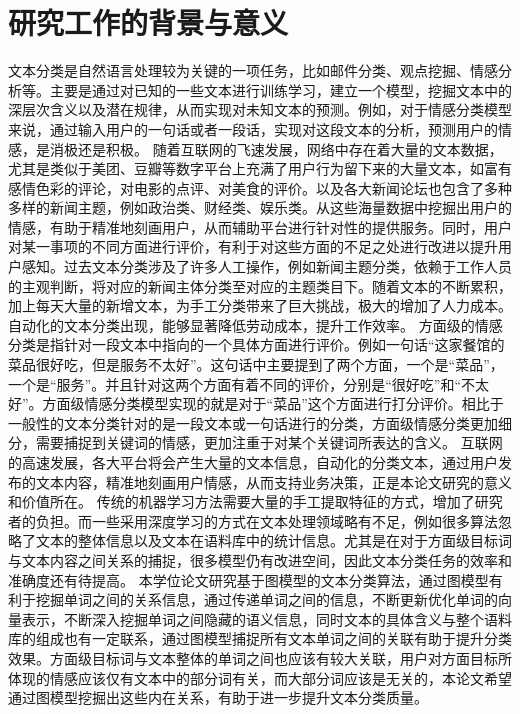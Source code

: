 \thesischapterexordium

\section{研究工作的背景与意义}
文本分类是自然语言处理较为关键的一项任务，比如邮件分类、观点挖掘、情感分析等。主要是通过对已知的一些文本进行训练学习，建立一个模型，挖掘文本中的深层次含义以及潜在规律，从而实现对未知文本的预测。例如，对于情感分类模型来说，通过输入用户的一句话或者一段话，实现对这段文本的分析，预测用户的情感，是消极还是积极。
随着互联网的飞速发展，网络中存在着大量的文本数据，尤其是类似于美团、豆瓣等数字平台上充满了用户行为留下来的大量文本，如富有感情色彩的评论，对电影的点评、对美食的评价。以及各大新闻论坛也包含了多种多样的新闻主题，例如政治类、财经类、娱乐类。从这些海量数据中挖掘出用户的情感，有助于精准地刻画用户，从而辅助平台进行针对性的提供服务。同时，用户对某一事项的不同方面进行评价，有利于对这些方面的不足之处进行改进以提升用户感知。过去文本分类涉及了许多人工操作，例如新闻主题分类，依赖于工作人员的主观判断，将对应的新闻主体分类至对应的主题类目下。随着文本的不断累积，加上每天大量的新增文本，为手工分类带来了巨大挑战，极大的增加了人力成本。自动化的文本分类出现，能够显著降低劳动成本，提升工作效率。
方面级的情感分类是指针对一段文本中指向的一个具体方面进行评价。例如一句话“这家餐馆的菜品很好吃，但是服务不太好”。这句话中主要提到了两个方面，一个是“菜品”，一个是“服务”。并且针对这两个方面有着不同的评价，分别是“很好吃”和“不太好”。方面级情感分类模型实现的就是对于“菜品”这个方面进行打分评价。相比于一般性的文本分类针对的是一段文本或一句话进行的分类，方面级情感分类更加细分，需要捕捉到关键词的情感，更加注重于对某个关键词所表达的含义。
互联网的高速发展，各大平台将会产生大量的文本信息，自动化的分类文本，通过用户发布的文本内容，精准地刻画用户情感，从而支持业务决策，正是本论文研究的意义和价值所在。
传统的机器学习方法需要大量的手工提取特征的方式，增加了研究者的负担。而一些采用深度学习的方式在文本处理领域略有不足，例如很多算法忽略了文本的整体信息以及文本在语料库中的统计信息。尤其是在对于方面级目标词与文本内容之间关系的捕捉，很多模型仍有改进空间，因此文本分类任务的效率和准确度还有待提高。       
本学位论文研究基于图模型的文本分类算法，通过图模型有利于挖掘单词之间的关系信息，通过传递单词之间的信息，不断更新优化单词的向量表示，不断深入挖掘单词之间隐藏的语义信息，同时文本的具体含义与整个语料库的组成也有一定联系，通过图模型捕捉所有文本单词之间的关联有助于提升分类效果。方面级目标词与文本整体的单词之间也应该有较大关联，用户对方面目标所体现的情感应该仅有文本中的部分词有关，而大部分词应该是无关的，本论文希望通过图模型挖掘出这些内在关系，有助于进一步提升文本分类质量。

